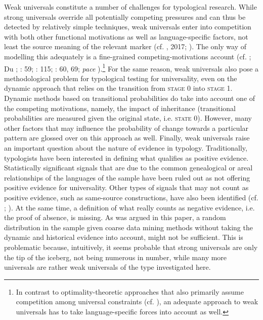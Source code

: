 \documentclass[output=paper]{langsci/langscibook}
\begin{document}
Weak universals constitute a number of challenges for typological research. While strong universals override all potentially competing pressures and can thus be detected by relatively simple techniques, weak universals enter into competition with both other functional motivations as well as language-specific factors, not least the source meaning of the relevant marker (cf. \citealt{Cristofaro2012}, 2017; \citealt{Hammarström2015}). The only way of modelling this adequately is a fine-grained competing-motivations account (cf. \citealt{Haiman1983}; Du \citealt{Bois1985}; \citealt{Croft2003}: 59; \citealt{Bickel2014}: 115; \citealt{Hawkins2014}: 60, 69; \textit{pace} \citealt{Cristofaro2019 [this volume]}).\footnote{In contrast to optimality-theoretic approaches that also primarily assume competition among universal constraints (cf. \citealt{Aissen2003}), an adequate approach to weak universals has to take language-specific forces into account as well.} For the same reason, weak universals also pose a methodological problem for typological testing for universality, even on the dynamic approach that relies on the transition from \textsc{stage} 0 into \textsc{stage} 1. Dynamic methods based on transitional probabilities do take into account one of the competing motivations, namely, the impact of inheritance (transitional probabilities are measured given the original state, i.e. \textsc{state 0}). However, many other factors that may influence the probability of change towards a particular pattern are glossed over on this approach as well. Finally, weak universals raise an important question about the nature of evidence in typology. Traditionally, typologists have been interested in defining what qualifies as positive evidence. Statistically significant signals that are due to the common genealogical or areal relationships of the languages of the sample have been ruled out as not offering positive evidence for universality. Other types of signals that may not count as positive evidence, such as same-source constructions, have also been identified (cf. \citealt{Cristofaro2017}; \citealt{Collins2019 [this volume]}). At the same time, a definition of what really counts as negative evidence, i.e. the proof of absence, is missing. As was argued in this paper, a random distribution in the sample given coarse data mining methods without taking the dynamic and historical evidence into account, might not be sufficient. This is problematic because, intuitively, it seems probable that strong universals are only the tip of the iceberg, not being numerous in number, while many more universals are rather weak universals of the type investigated here. 
\end{document}
